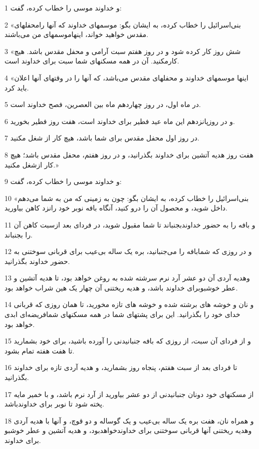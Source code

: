 \par 1 و خداوند موسی را خطاب کرده، گفت:
\par 2 «بنی‌اسرائیل را خطاب کرده، به ایشان بگو: موسمهای خداوند که آنها رامحفلهای مقدس خواهید خواند، اینهاموسمهای من می‌باشند.
\par 3 «شش روز کار کرده شود و در روز هفتم سبت آرامی و محفل مقدس باشد. هیچ کارمکنید. آن در همه مسکنهای شما سبت برای خداوند است.
\par 4 «اینها موسمهای خداوند و محفلهای مقدس می‌باشد، که آنها را در وقتهای آنها اعلان باید کرد.
\par 5 در ماه اول، در روز چهاردهم ماه بین العصرین، فصح خداوند است.
\par 6 و در روزپانزدهم این ماه عید فطیر برای خداوند است، هفت روز فطیر بخورید.
\par 7 در روز اول محفل مقدس برای شما باشد، هیچ کار از شغل مکنید.
\par 8 هفت روز هدیه آتشین برای خداوند بگذرانید، و در روز هفتم، محفل مقدس باشد؛ هیچ کار ازشغل مکنید.»
\par 9 و خداوند موسی را خطاب کرده، گفت:
\par 10 «بنی‌اسرائیل را خطاب کرده، به ایشان بگو: چون به زمینی که من به شما می‌دهم داخل شوید، و محصول آن را درو کنید، آنگاه بافه نوبر خود رانزد کاهن بیاورید.
\par 11 و بافه را به حضور خداوندبجنباند تا شما مقبول شوید، در فردای بعد ازسبت کاهن آن را بجنباند.
\par 12 و در روزی که شمابافه را می‌جنبانید، بره یک ساله بی‌عیب برای قربانی سوختنی به حضور خداوند بگذرانید.
\par 13 وهدیه آردی آن دو عشر آرد نرم سرشته شده به روغن خواهد بود، تا هدیه آتشین و عطر خوشبوبرای خداوند باشد، و هدیه ریختنی آن چهار یک هین شراب خواهد بود.
\par 14 و نان و خوشه های برشته شده و خوشه های تازه مخورید، تا همان روزی که قربانی خدای خود را بگذرانید. این برای پشتهای شما در همه مسکنهای شمافریضه‌ای ابدی خواهد بود.
\par 15 و از فردای آن سبت، از روزی که بافه جنبانیدنی را آورده باشید، برای خود بشمارید تا هفت هفته تمام بشود.
\par 16 تا فردای بعد از سبت هفتم، پنجاه روز بشمارید، و هدیه آردی تازه برای خداوند بگذرانید.
\par 17 از مسکنهای خود دونان جنبانیدنی از دو عشر بیاورید از آرد نرم باشد، و با خمیر مایه پخته شود تا نوبر برای خداوندباشد.
\par 18 و همراه نان، هفت بره یک ساله بی‌عیب و یک گوساله و دو قوچ، و آنها با هدیه آردی وهدیه ریختنی آنها قربانی سوختنی برای خداوندخواهدبود، و هدیه آتشین و عطر خوشبو برای خداوند.
